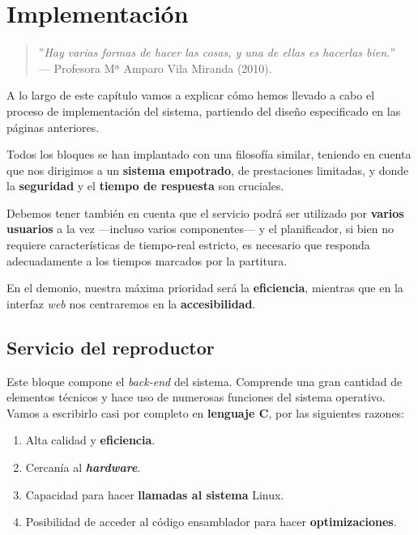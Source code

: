 \chapter{Implementación}
\label{cap: capitulo_5}

\begin{quote}
	\small \flushright ''\textit{Hay varias formas de hacer las cosas, y una de ellas es hacerlas bien.}'' \\
	--- Profesora Mª Amparo Vila Miranda (2010).
\end{quote}

\vspace{8em}

A lo largo de este capítulo vamos a explicar cómo hemos llevado a cabo el proceso de implementación del sistema, partiendo del diseño especificado en las páginas anteriores.

Todos los bloques se han implantado con una filosofía similar, teniendo en cuenta que nos dirigimos a un \textbf{sistema empotrado}, de prestaciones limitadas, y donde la \textbf{seguridad} y el \textbf{tiempo de respuesta} son cruciales.

Debemos tener también en cuenta que el servicio podrá ser utilizado por \textbf{varios usuarios} a la vez ---incluso varios componentes--- y el planificador, si bien no requiere características de tiempo-real estricto, es necesario que responda adecuadamente a los tiempos marcados por la partitura.

En el demonio, nuestra máxima prioridad será la \textbf{eficiencia}, mientras que en la interfaz \textit{web} nos centraremos en la \textbf{accesibilidad}.

\newpage

\section{Servicio del reproductor}

Este bloque compone el \textit{back-end} del sistema. Comprende una gran cantidad de elementos técnicos y hace uso de numerosas funciones del sistema operativo. Vamos a escribirlo casi por completo en \textbf{lenguaje C}, por las siguientes razones:

\begin{enumerate}
	\item Alta calidad y \textbf{eficiencia}.
	\item Cercanía al \textbf{\textit{hardware}}.
	\item Capacidad para hacer \textbf{llamadas al sistema} Linux.
	\item Posibilidad de acceder al código ensamblador para hacer \textbf{optimizaciones}.
\end{enumerate}


